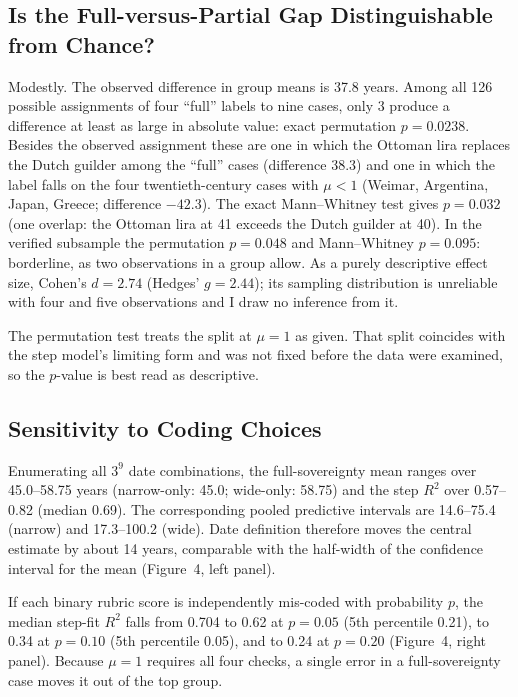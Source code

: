 \documentclass[11pt,letterpaper]{article}
\theoremstyle{definition}
\theoremstyle{plain}
\begin{document}
\subsection{Is the Full-versus-Partial Gap Distinguishable from Chance?}\label{sec:chance}
Modestly. The observed difference in group means is 37.8 years. Among all 126 possible assignments of four ``full'' labels to nine cases, only 3 produce a difference at least as large in absolute value: exact permutation $p=0.0238$. Besides the observed assignment these are one in which the Ottoman lira replaces the Dutch guilder among the ``full'' cases (difference 38.3) and one in which the label falls on the four twentieth-century cases with $\mu<1$ (Weimar, Argentina, Japan, Greece; difference $-42.3$). The exact Mann--Whitney test gives $p=0.032$ (one overlap: the Ottoman lira at 41 exceeds the Dutch guilder at 40). In the verified subsample the permutation $p=0.048$ and Mann--Whitney $p=0.095$: borderline, as two observations in a group allow. As a purely descriptive effect size, Cohen's $d=2.74$ (Hedges' $g=2.44$); its sampling distribution is unreliable with four and five observations and I draw no inference from it.

The permutation test treats the split at $\mu=1$ as given. That split coincides with the step model's limiting form and was not fixed before the data were examined, so the $p$-value is best read as descriptive.

\subsection{Sensitivity to Coding Choices}\label{sec:coding}
Enumerating all $3^9$ date combinations, the full-sovereignty mean ranges over 45.0--58.75 years (narrow-only: 45.0; wide-only: 58.75) and the step $R^2$ over 0.57--0.82 (median 0.69). The corresponding pooled predictive intervals are 14.6--75.4 (narrow) and 17.3--100.2 (wide). Date definition therefore moves the central estimate by about 14 years, comparable with the half-width of the confidence interval for the mean (Figure~4, left panel).

If each binary rubric score is independently mis-coded with probability $p$, the median step-fit $R^2$ falls from 0.704 to 0.62 at $p=0.05$ (5th percentile 0.21), to 0.34 at $p=0.10$ (5th percentile 0.05), and to 0.24 at $p=0.20$ (Figure~4, right panel). Because $\mu=1$ requires all four checks, a single error in a full-sovereignty case moves it out of the top group.
\end{document}
